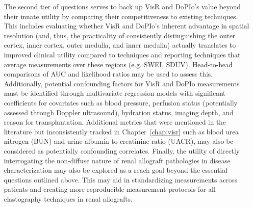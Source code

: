 %
%
%

The second tier of questions serves to back up VisR and DoPIo's value beyond their innate utility by comparing their competitiveness to existing techniques. This includes evaluating whether VisR and DoPIo's inherent advantage in spatial resolution (and, thus, the practicality of consistently distinguishing the outer cortex, inner cortex, outer medulla, and inner medulla) actually translates to improved clinical utility compared to techniques and reporting techniques that average measurements over these regions (e.g. SWEI, SDUV). Head-to-head comparisons of AUC and likelihood ratios may be used to assess this. Additionally, potential confounding factors for VisR and DoPIo measurements must be identified through multivariate regression models with significant coefficients for covariates such as blood pressure, perfusion status (potentially assessed through Doppler ultrasound), hydration status, imaging depth, and reason for transplantation. Additional metrics that were mentioned in the literature but inconsistently tracked in Chapter~\ref{chap:visr} such as blood urea nitrogen (BUN) and urine albumin-to-creatinine ratio (UACR), may also be considered as potentially confounding correlates. Finally, the utility of directly interrogating the non-diffuse nature of renal allograft pathologies in disease characterization may also be explored as a reach goal beyond the essential questions outlined above. This may aid in standardizing measurements across patients and creating more reproducible measurement protocols for all elastography techniques in renal allografts.

